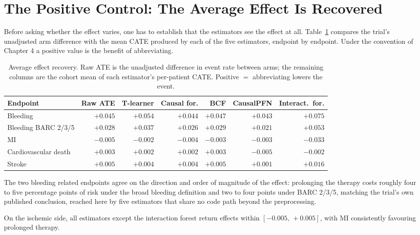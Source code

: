 \section{The Positive Control: The Average Effect Is Recovered}
\label{sec:positive-control}

Before asking whether the effect varies, one has to establish that the
estimators see the effect at all. Table~\ref{tab:ate-recovery} compares the
trial's unadjusted arm difference with the mean CATE produced by each of the
five estimators, endpoint by endpoint. Under the convention of Chapter 4 a
positive value is the benefit of abbreviating.

\begin{table}[H]
\centering
\caption{Average effect recovery. Raw ATE is the unadjusted difference in event
rate between arms; the remaining columns are the cohort mean of each
estimator's per-patient CATE. Positive $=$ abbreviating lowers the event.}
\label{tab:ate-recovery}
\small
\setlength{\tabcolsep}{4pt}
\begin{tabular}{lrrrrrr}
\toprule
Endpoint & Raw ATE & T-learner & Causal for. & BCF & CausalPFN & Interact.\ for. \\
\midrule
Bleeding             & $+0.045$ & $+0.054$ & $+0.044$ & $+0.047$ & $+0.043$ & $+0.075$ \\
Bleeding BARC 2/3/5  & $+0.028$ & $+0.037$ & $+0.026$ & $+0.029$ & $+0.021$ & $+0.053$ \\
MI                   & $-0.005$ & $-0.002$ & $-0.004$ & $-0.003$ & $-0.003$ & $-0.033$ \\
Cardiovascular death & $+0.003$ & $+0.002$ & $+0.002$ & $+0.003$ & $-0.005$ & $-0.002$ \\
Stroke               & $+0.005$ & $+0.004$ & $+0.004$ & $+0.005$ & $+0.001$ & $+0.016$ \\
\bottomrule
\end{tabular}
\end{table}

The two bleeding related endpoints agree on the direction and order of
magnitude of the effect: prolonging the therapy costs roughly four to five
percentage points of risk under the broad bleeding definition and two to
four points under BARC 2/3/5, matching the trial's own published conclusion,
reached here by five estimators that share no code path beyond the
preprocessing.

On the ischemic side, all estimators except the interaction forest return
effects within $[-0.005,\,+0.005]$, with MI consistently favouring
prolonged therapy.

